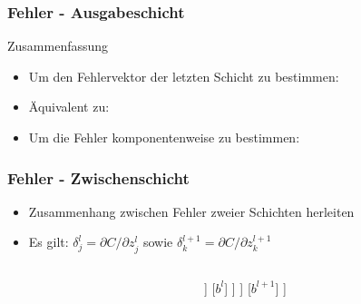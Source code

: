 \begin{frame}
\frametitle{Fehler - Ausgabeschicht}

\begin{block}{Zusammenfassung}
\begin{itemize}
\item Um den Fehlervektor der letzten Schicht zu bestimmen: 
\item Äquivalent zu: 
\item Um die Fehler komponentenweise zu bestimmen:
\end{itemize}
\end{block}


\end{frame}



\begin{frame}
\frametitle{Fehler - Zwischenschicht} 

\begin{itemize}
\item Zusammenhang zwischen Fehler zweier Schichten herleiten
\item Es gilt: $\delta^l_j = \partial C / \partial z^l_j$ sowie $\delta^{l+1}_k = \partial C / \partial z^{l+1}_k$
\end{itemize}

\begin{columns}

\begin{column}{.5\textwidth}
\vspace{-10mm}

\end{column}

\hspace{-15mm}
\vrule

\begin{column}{.5\textwidth}

\begin{center}
\begin{forest}
 [$z^{l+1}$
 	[$w^{l+1}$]
 	[$a^{l}$
 		[$z^{l}$
			[$w^l$]
			[$a^{l-1}$
				[\ldots]
			]
			[$b^{l}$]
 		]
 	]
 	[$b^{l+1}$]
 ]
\end{forest}
\end{center}

\end{column}
\end{columns}

\end{frame}



